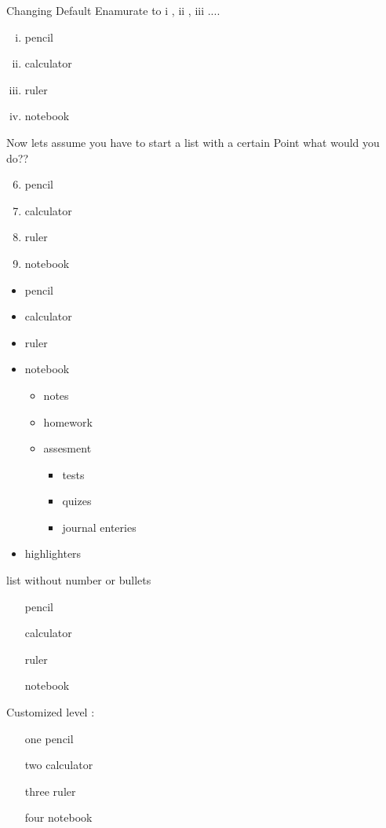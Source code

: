 \documentclass[11pt]{article}              %
\begin{document}
	\vspace{1cm}
	Changing Default Enamurate to i , ii , iii ....
	\begin{enumerate}[i.]		            %
		\item pencil
		\item calculator
		\item ruler
		\item notebook
	\end{enumerate}
	
	Now lets assume you have to start a list with a certain Point what would you do??
	
	\begin{enumerate} \setcounter{enumi}{5}  %
		\item pencil
		\item calculator
		\item ruler
		\item notebook
	\end{enumerate}
	
	\pagebreak
	
	\begin{itemize}		                %
		\item pencil
		\item calculator
		\item ruler
		\item notebook
		\begin{itemize}		            %
			\item notes
			\item homework
			\item assesment
			\begin{itemize}	        %
				\item tests
				\item quizes
				\item journal enteries
			\end{itemize}
		\end{itemize}
		\item highlighters
	\end{itemize}
	
	\vspace{4cm}
	
	list without number or bullets
	\begin{enumerate}		                %
		\item[] pencil
		\item[] calculator
		\item[] ruler
		\item[] notebook
	\end{enumerate}
	
	\vspace{4cm}
	Customized level :
	\begin{enumerate}		                %
		\item[one] pencil
		\item[two] calculator
		\item[three] ruler
		\item[four] notebook
	\end{enumerate}
	
\end{document}
